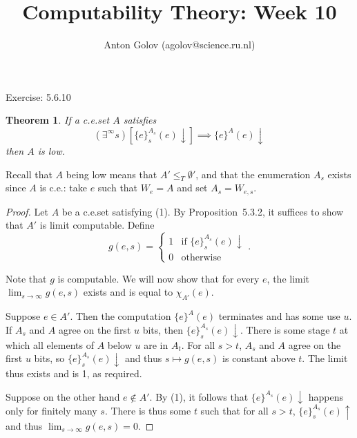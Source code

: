 \documentclass{article}
\title{Computability Theory: Week 10}
\author{Anton Golov (agolov@science.ru.nl)}
\newtheorem{theorem}{Theorem}
\newcommand{\set}[1]{\{ #1 \}}
\newcommand{\terminates}{\!\!\downarrow}
\newcommand{\diverges}{\!\!\uparrow}
\begin{document}
  \maketitle

  Exercise: 5.6.10

  \begin{theorem}
    If a c.e.\@ set $A$ satisfies
    \begin{equation}
      (\exists^\infty s)[\set{e}^{A_s}_s(e)\terminates] \implies \set{e}^A(e)\terminates
    \end{equation}
    then $A$ is low.
  \end{theorem}

  Recall that $A$ being low means that $A' \le_T \emptyset'$, and that the enumeration $A_s$ exists since $A$ is c.e.:
  take $e$ such that $W_e = A$ and set $A_s = W_{e, s}$.

  \begin{proof}
    Let $A$ be a c.e.\@ set satisfying (1).  By Proposition~5.3.2, it suffices to show that $A'$ is limit computable.
    Define
    \[
      g(e, s) =
      \begin{cases}
        1 & \text{if $\set{e}^{A_s}_s(e)\terminates$}\\
        0 & \text{otherwise}
      \end{cases}.
    \]

    Note that $g$ is computable.  We will now show that for every $e$, the limit $\lim_{s \to \infty} g(e, s)$ exists
    and is equal to $\chi_{A'}(e)$.

    Suppose $e \in A'$.  Then the computation $\set{e}^A(e)$ terminates and has some use $u$.  If $A_s$ and $A$ agree on
    the first $u$ bits, then $\set{e}^{A_s}_s(e)\terminates$.  There is some stage $t$ at which all elements of $A$
    below $u$ are in $A_t$.  For all $s > t$, $A_s$ and $A$ agree on the first $u$ bits, so $\set{e}^{A_s}_s(e)\terminates$
    and thus $s \mapsto g(e, s)$ is constant above $t$.  The limit thus exists and is 1, as required.

    Suppose on the other hand $e \not \in A'$.  By (1), it follows that $\set{e}^{A_s}(e)\terminates$ happens only for
    finitely many $s$.  There is thus some $t$ such that for all $s > t$, $\set{e}^{A_s}_s(e)\diverges$ and thus
    $\lim_{s \to \infty} g(e, s) = 0$.
  \end{proof}
\end{document}
